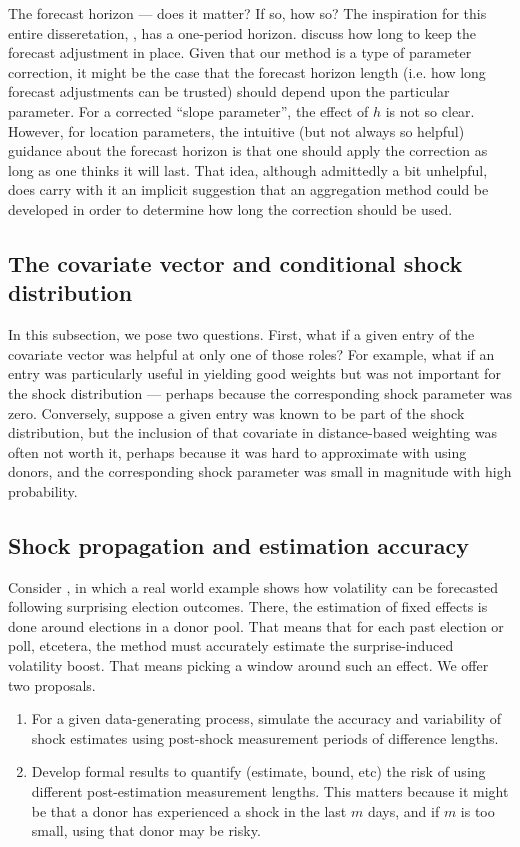 \documentclass{uiucthesis2021}
\theoremstyle{definition}
\begin{document}
  The forecast horizon --- does it matter?  If so, how so?  The inspiration for this entire disseretation, \cite[][]{lin2021minimizing}, has a one-period horizon.  \cite[][p. 203]{clements1998forecasting} discuss how long to keep the forecast adjustment in place.  Given that our method is a type of parameter correction, it might be the case that the forecast horizon length (i.e. how long forecast adjustments can be trusted) should depend upon the particular parameter.  For a corrected ``slope parameter'', the effect of $h$ is not so clear.  However, for location parameters, the intuitive (but not always so helpful) guidance about the forecast horizon is that one should apply the correction as long as one thinks it will last.  That idea, although admittedly a bit unhelpful, does carry with it an implicit suggestion that an aggregation method could be developed in order to determine how long the correction should be used.

  
  \subsection{The covariate vector and conditional shock distribution}
  In this subsection, we pose two questions.  First, what if a given entry of the covariate vector was helpful at only one of those roles?  For example, what if an entry was particularly useful in yielding good weights but was not important for the shock distribution --- perhaps because the corresponding shock parameter was zero.  Conversely, suppose a given entry was known to be part of the shock distribution, but the inclusion of that covariate in distance-based weighting was often not worth it, perhaps because it was hard to approximate with using donors, and the corresponding shock parameter was small in magnitude with high probability.
  
  \subsection{Shock propagation and estimation accuracy}
  Consider \cite[][]{lundquist2024volatility}, in which a real world example shows how volatility can be forecasted following surprising election outcomes.  There, the estimation of fixed effects is done around elections in a donor pool.  That means that for each past election or poll, etcetera, the method must accurately estimate the surprise-induced volatility boost.  That means picking a window around such an effect.  We offer two proposals.
  \begin{enumerate}
    \item For a given data-generating process, simulate the accuracy and variability of shock estimates using post-shock measurement periods of difference lengths.
    \item Develop formal results to quantify (estimate, bound, etc) the risk of using different post-estimation measurement lengths.  This matters because it might be that a donor has experienced a shock in the last $m$ days, and if $m$ is too small, using that donor may be risky.
  \end{enumerate}
      
\end{document}

